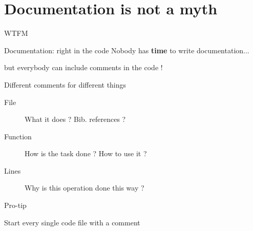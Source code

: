 \documentclass[10pt]{beamer}
\begin{document}

\section{Documentation is not a myth} %

\begin{frame}{WTFM} %
	\begin{center}
	\end{center}

\end{frame}

\begin{frame}{Documentation: right in the code} %
	Nobody has \textbf{time} to write documentation...

	but everybody can include comments in the code !

	\pause
	\medskip

	\begin{block}{Different comments for different things}
		\begin{description}
			\item[File] What it does ? Bib. references ?
			\item[Function] How is the task done ? How to use it ?
			\item[Lines] Why is this operation done this way ?
		\end{description}
	\end{block}

	\pause
	\medskip

	\begin{block}{Pro-tip}
		\begin{center}
			Start every single code file with a comment
		\end{center}
	\end{block}

\end{frame}
\end{document}
